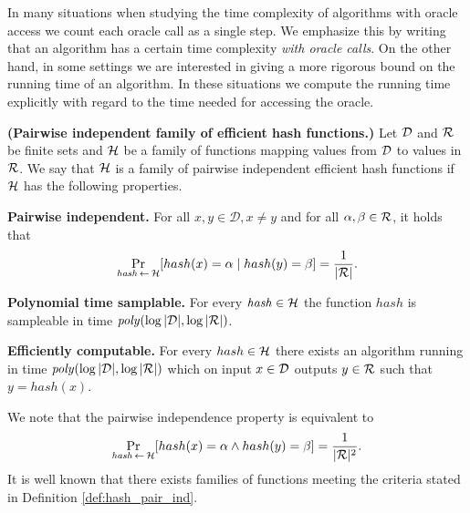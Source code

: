 In many situations when studying the time complexity of algorithms with oracle access we count each oracle call as a single step.
We emphasize this by writing that an algorithm has a certain time complexity \textit{with oracle calls}.
On the other hand, in some settings we are interested in giving a more rigorous bound on the running time of an algorithm.
In these situations we compute the running time explicitly with regard to the time needed for accessing the oracle.

\begin{definition}\textbf{(Pairwise independent family of efficient hash functions.)}
  \label{def:hash_pair_ind}
Let $\mathcal{D}$ and $\mathcal{R}$ be finite sets and $\mathcal{H}$ be a family of functions mapping values from $\mathcal{D}$ to values in $\mathcal{R}$.
We say that $\mathcal{H}$ is a \textnormal{family of pairwise independent efficient hash functions}
if $\mathcal{H}$ has the following properties.

\textbf{Pairwise independent.} For all $x, y \in \mathcal{D}, x \neq y$ and for all $\alpha, \beta \in \mathcal{R}$, it holds that
\begin{displaymath}
\underset{\hash \la0 \cH}{\Pr}[hash(x) = \alpha \mid hash(y) = \beta] = \frac{1}{|\cR|}.
\end{displaymath}

\textbf{Polynomial time samplable.} For every $\mathit{hash} \in \mathcal{H}$ the function $\mathit{hash}$ is sampleable in time $\mathit{poly}(\log|\mathcal{D}|, \log|\mathcal{R}|)$.

\textbf{Efficiently computable.}
For every $hash \in \mathcal{H}$ there exists an algorithm running in time $\mathit{poly}(\log|\mathcal{D}|, \log|\mathcal{R}|)$ which
on input $x \in \mathcal{D}$ outputs $y \in \mathcal{R}$ such that $y = hash(x)$.
\end{definition}

We note that the pairwise independence property is equivalent to
\begin{displaymath}
\underset{\hash \la0 \cH}{\Pr}[hash(x) = \alpha \land hash(y) = \beta] = \frac{1}{|\cR|^2}.
\end{displaymath}
It is well known \cite{Carter:1977:UCH:800105.803400} that there exists families of functions meeting the criteria stated in Definition \ref{def:hash_pair_ind}.

